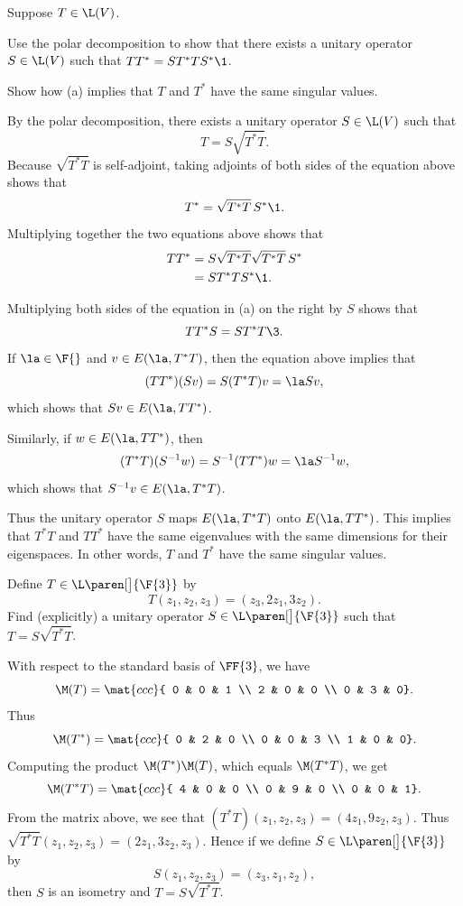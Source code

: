 \exercise
Suppose $T \in \L(V)$.
\begin{subtheorem}
\item
Use the polar decomposition to show that there exists a unitary operator $S \in \L(V)$ such that
$TT^* = ST^*TS^*\1$.
\item
Show how (a) implies that $T$ and $T^*$ have the same singular values.
\end{subtheorem}

\begin{Solution}
\begin{subtheorem}
\item
By the polar decomposition, there exists a unitary operator $S \in \L(V)$ such that
\[
T = S \sqrt{T^*T}.
\]
Because $\sqrt{T^*T}$ is self-adjoint, taking adjoints of both sides of the equation above shows that
\[
T^* = \sqrt{T^*T} \,S^*\1.
\]
Multiplying together the two equations above shows that
\begin{align*}
TT^* &= S \sqrt{T^*T} \sqrt{T^*T} \, S^* \\
&= S T^* T S^*\1.
\end{align*}

\item
Multiplying both sides of the equation in (a) on the right by $S$ shows that
\[
TT^* S = ST^*T\3.
\]
If $\la \in \F{}$ and $v \in E(\la, T^*T)$, then the equation above implies that
\[
(TT^*)(Sv) = S(T^*T)v = \la Sv,
\]
which shows that $Sv \in E(\la,TT^*)$.

Similarly, if $w \in E(\la, TT^*)$, then
\[
(T^*T)(S^{-1}w) = S^{-1} (TT^*)w = \la S^{-1}w,
\]
which shows that $S^{-1}v \in E(\la,T^*T)$.

Thus the unitary operator $S$ maps $E(\la, T^*T)$ onto $E(\la, TT^*)$. This implies that $T^*T$ and $TT^*$ have the same eigenvalues with the same dimensions for their eigenspaces. In other words, $T$ and $T^*$ have the same singular values.
\end{subtheorem}
\end{Solution}

\exercise
Define $T \in \L\paren[\big]{\F{3}}$ by
\[
T(z_1, z_2, z_3) = (z_3, 2z_1, 3z_2).
\]
Find (explicitly) a unitary operator $S \in \L\paren[\big]{\F{3}}$ such that $T = S \sqrt{T^*T}$.

\begin{Solution}
With respect to the standard basis of $\FF{3}$, we have
\[
\M(T) = \mat{ccc}{
0 & 0 & 1 \\
2 & 0 & 0 \\
0 & 3 & 0}.
\]
Thus
\[
\M(T^*) = \mat{ccc}{
0 & 2 & 0 \\
0 & 0 & 3 \\
1 & 0 & 0}.
\]
Computing the product $\M(T^*) \M(T)$, which equals $\M(T^* T)$, we get
\[
\M(T^* T) = \mat{ccc}{
4 & 0 & 0 \\
0 & 9 & 0 \\
0 & 0 & 1}.
\]
{}From the matrix above, we see that $(T^*T)(z_1, z_2, z_3) = (4z_1, 9z_2, z_3)$.
Thus $\sqrt{T^*T}(z_1, z_2, z_3) = (2z_1, 3z_2, z_3)$.  Hence if we define
$S \in \L\paren[\big]{\F{3}}$ by
\[
S(z_1, z_2, z_3) = (z_3, z_1, z_2),
\]
then $S$ is an isometry and $T = S \sqrt{T^*T}$.
\end{Solution}

